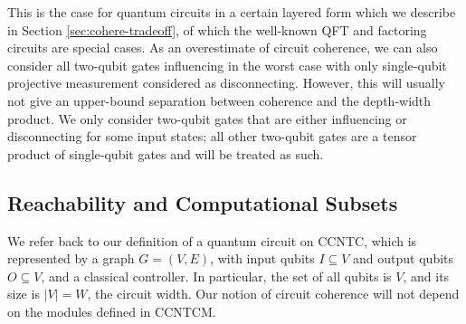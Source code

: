 This is the case for
quantum circuits in a certain layered form which we describe in
Section \ref{sec:cohere-tradeoff},
of which the 
well-known QFT and factoring circuits are special cases.
As an overestimate of circuit coherence, we can also consider all
two-qubit gates influencing in the worst case
with
only single-qubit projective measurement considered as disconnecting.
However, this will usually
not give an upper-bound separation between coherence and the depth-width product.
We only consider two-qubit gates that are either influencing or disconnecting
for some input states; all other two-qubit gates are a tensor product of
single-qubit gates and will be treated as such.

\subsection{Reachability and Computational Subsets}
\label{subsec:cohere-subset}

We refer back to our definition of a quantum circuit on
\textsf{CCNTC}, which is represented by a graph $G = (V,E)$,
with input qubits $I \subseteq V$ and output qubits $O \subseteq V$, and a
classical controller. In particular, the set of all qubits is $V$,
and its size is $|V|=W$, the circuit width.
Our notion of circuit coherence will not depend
on the modules defined in \textsf{CCNTCM}.

